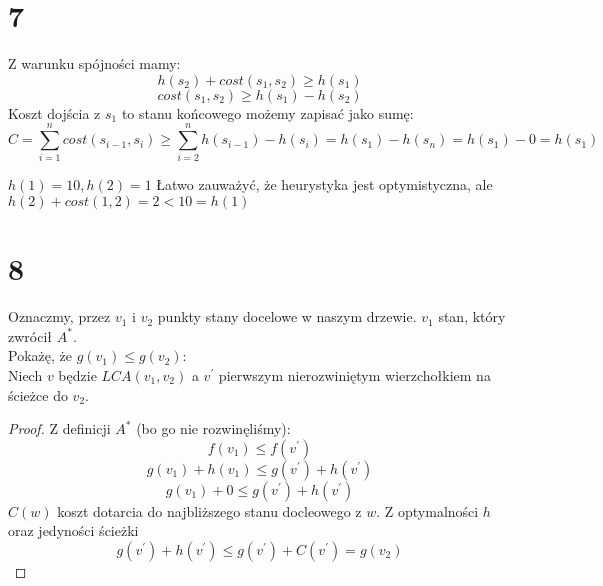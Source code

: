 \documentclass{article}
\begin{document}
\section{7}
Z warunku spójności mamy:
$$
h(s_2) + cost(s_1,s_2) \geq h(s_1)
$$
$$
cost(s_1,s_2) \geq h(s_1) - h(s_2)
$$
Koszt dojścia z $s_1$ to stanu końcowego możemy zapisać jako sumę:
$$
C = \sum_{i = 1}^{n} cost(s_{i-1},s_i) \geq \sum_{i = 2}^{n} h(s_{i-1}) - h(s_{i}) = h(s_1) - h(s_n) = h(s_1) - 0 = h(s_1)
$$

$h(1) = 10, h(2) = 1$ Łatwo zauważyć, że heurystyka jest optymistyczna, ale $h(2) + cost(1,2) = 2 < 10 = h(1) $

\section{8}
Oznaczmy, przez $v_1$ i $v_2$ punkty stany docelowe w naszym drzewie. $v_1$ stan, który zwrócił $A^*$.\\
Pokażę, że $g(v_1) \leq g(v_2)$:
\\Niech $v$ będzie $LCA(v_1,v_2)$ a $v^{\prime}$ pierwszym nierozwiniętym wierzchołkiem na ścieżce do $v_2$.
\begin{proof}
Z definicji $A^*$ (bo go nie rozwinęliśmy):
$$
f(v_1) \leq f(v^\prime)
$$
$$
g(v_1) + h(v_1) \leq g(v^\prime) + h(v^\prime)
$$
$$
g(v_1) + 0 \leq g(v^\prime) + h(v^\prime)
$$
$C(w)$ koszt dotarcia do najbliższego stanu docleowego z $w$. Z optymalności $h$ oraz jedyności ścieżki\\
$$
g(v^\prime) + h(v^\prime) \leq g(v^\prime) + C(v^\prime) = g(v_2)
$$
\end{proof}
\end{document}

